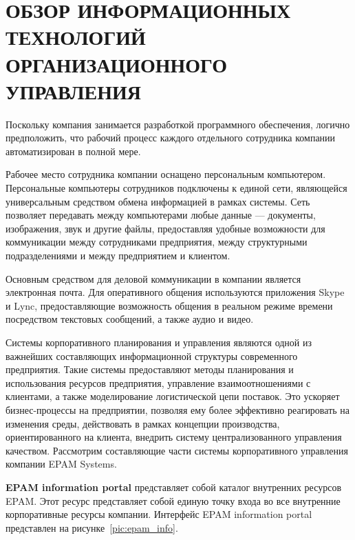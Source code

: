 \section[Обзор информационных технологий организационного управления]{%
  ОБЗОР ИНФОРМАЦИОННЫХ ТЕХНОЛОГИЙ \\
  ОРГАНИЗАЦИОННОГО УПРАВЛЕНИЯ
}
\label{sec:org_management}

Поскольку компания занимается разработкой программного обеспечения,
логично предположить, что рабочий процесс каждого отдельного сотрудника компании
автоматизирован в полной мере.

Рабочее место сотрудника компании оснащено персональным компьютером.
Персональные компьютеры сотрудников подключены к единой сети, являющейся
универсальным средством обмена информацией в рамках системы.
Сеть позволяет передавать между компьютерами любые данные ---
документы, изображения, звук и другие файлы, предоставляя удобные возможности
для коммуникации между сотрудниками предприятия, между структурными подразделениями
и между предприятием и клиентом.

Основным средством для деловой коммуникации в компании является электронная почта.
Для оперативного общения используются приложения Skype и Lync,
предоставляющие возможность общения в реальном режиме времени
посредством текстовых сообщений, а также аудио и видео.

Системы корпоративного планирования и управления являются одной из
важнейших составляющих информационной структуры современного предприятия.
Такие системы предоставляют методы планирования и использования ресурсов предприятия,
управление взаимоотношениями с клиентами, а также моделирование логистической цепи поставок.
Это ускоряет бизнес-процессы на предприятии, позволяя ему более эффективно реагировать на
изменения среды, действовать в рамках концепции производства, ориентированного на клиента,
внедрить систему централизованного управления качеством.
Рассмотрим составляющие части системы корпоративного управления
компании EPAM Systems.

\textbf{EPAM information portal} представляет собой каталог внутренних ресурсов EPAM.
Этот ресурс представляет собой единую точку входа во все внутренние корпоративные ресурсы
компании.
Интерфейс EPAM information portal представлен на рисунке~\ref{pic:epam_info}.

\pagebreak

